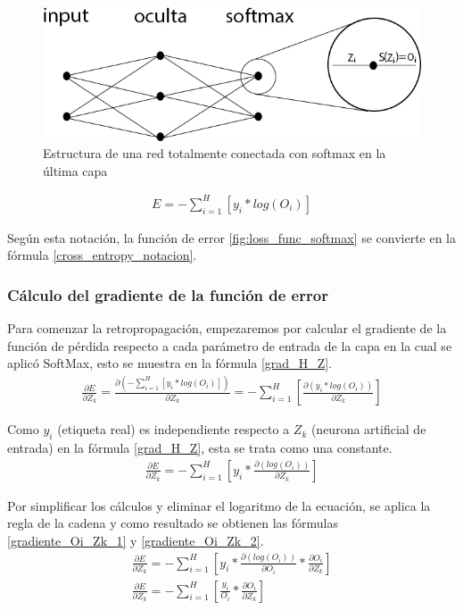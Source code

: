 \begin{figure}[H]
	\centering
	\includegraphics[scale=0.4]{imagenes/NN_softmax.jpg}  
	\caption{Estructura de una red totalmente conectada con softmax en la última capa}
\end{figure}

\begin{gather}
	E = - \sum_{i=1}^{H}  [y_i * log(O_i)] 
	\label{cross_entropy_notacion}
\end{gather}

Según esta notación, la función de error \ref{fig:loss_func_softmax} se convierte en la fórmula \ref{cross_entropy_notacion}.

\subsubsection{Cálculo del gradiente de la función de error}

Para comenzar la retropropagación, empezaremos por calcular el gradiente de la función de pérdida respecto a cada parámetro de entrada de la capa en la cual se aplicó SoftMax, esto se muestra en la fórmula \ref{grad_H_Z}.
\begin{gather}
	\frac{\partial E}{\partial Z_k} = \frac{\partial(- \sum_{i=1}^{H}  [y_i * log(O_i)])}{\partial Z_k} = - \sum_{i=1}^{H}  [\frac{\partial(y_i * log(O_i))}{\partial Z_k}] 
	\label{grad_H_Z}
\end{gather}

Como $y_i$ (etiqueta real) es independiente respecto a $Z_k$ (neurona artificial de entrada) en la fórmula \ref{grad_H_Z}, esta se trata como una constante. \\
\begin{gather}
	\frac{\partial E}{\partial Z_k} = - \sum_{i=1}^{H}  [y_i * \frac{\partial(log(O_i))}{\partial Z_k}] 
	\label{grad_O_K}
\end{gather}

Por simplificar los cálculos y eliminar el logaritmo de la ecuación, se aplica la regla de la cadena y como resultado se obtienen las fórmulas \ref{gradiente_Oi_Zk_1} y \ref{gradiente_Oi_Zk_2}.
\begin{gather}	
	\frac{\partial E}{\partial Z_k} = - \sum_{i=1}^{H}  [y_i * \frac{\partial(log(O_i))}{\partial O_i} * \frac{\partial O_i}{\partial Z_k}]
	\label{gradiente_Oi_Zk_1} \\
	\frac{\partial E}{\partial Z_k} = - \sum_{i=1}^{H}  [\frac{y_i}{O_i} * \frac{\partial O_i}{\partial Z_k}] 
	\label{gradiente_Oi_Zk_2}
\end{gather}

